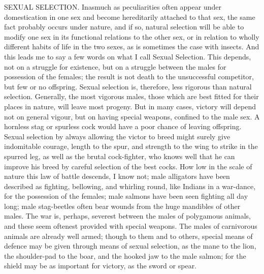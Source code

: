 SEXUAL SELECTION.
Inasmuch as peculiarities often appear under domestication in one sex and become hereditarily attached to that sex, the same fact probably occurs under nature, and if so, natural selection will be able to modify one sex in its functional relations to the other sex, or in relation to wholly different habits of life in the two sexes, as is sometimes the case with insects. And this leads me to say a few words on what I call Sexual Selection. This depends, not on a struggle for existence, but on a struggle between the males for possession of the females; the result is not death to the unsuccessful competitor, but few or no offspring. Sexual selection is, therefore, less rigorous than natural selection. Generally, the most vigorous males, those which are best fitted for their places in nature, will leave most progeny. But in many cases, victory will depend not on general vigour, but on having special weapons, confined to the male sex. A hornless stag or spurless cock would have a poor chance of leaving offspring. Sexual selection by always allowing the victor to breed might surely give indomitable courage, length to the spur, and strength to the wing to strike in the spurred leg, as well as the brutal cock-fighter, who knows well that he can improve his breed by careful selection of the best cocks. How low in the scale of nature this law of battle descends, I know not; male alligators have been described as fighting, bellowing, and whirling round, like Indians in a war-dance, for the possession of the females; male salmons have been seen fighting all day long; male stag-beetles often bear wounds from the huge mandibles of other males. The war is, perhaps, severest between the males of polygamous animals, and these seem oftenest provided with special weapons. The males of carnivorous animals are already well armed; though to them and to others, special means of defence may be given through means of sexual selection, as the mane to the lion, the shoulder-pad to the boar, and the hooked jaw to the male salmon; for the shield may be as important for victory, as the sword or spear.
